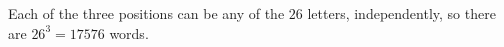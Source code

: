 Each of the three positions can be any of the $26$ letters, independently, so there are $26^3=\boxed{17576}$ words.

